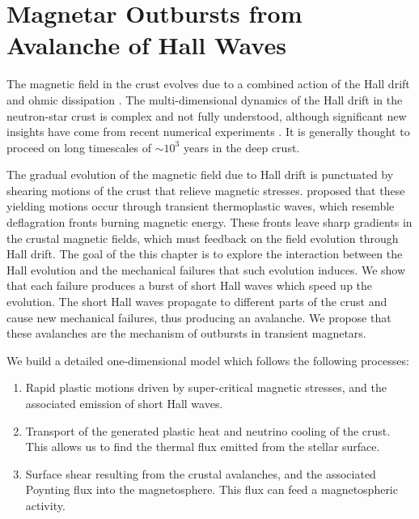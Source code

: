 \def\T{{\mathcal T}}
\def\scr{s_{\rm cr}}
\def\Ts{T_{\rm s}}
\def\Tm{T_{\rm melt}}
\def\zmelt{z_{\rm melt}}
\def\beq{\begin{equation}}
\def\eeq{\end{equation}}
\def\sel{s_{\rm el}}
\def\spl{s_{\rm pl}}
\def\dspl{\dot{s}_{\rm pl}}
\def\sigcr{\sigma_{\rm cr}}
\def\Um{U_{\rm melt}}
\def\Uth{U_{\rm th}}
\def\Eq{Equation}
\def\Eqs{Equations}
\def\Ekin{E_{\rm kin}}
\def\Emag{E_{\rm mag}}
\def\Eel{E_{\rm el}}
\def\zd{z_{\rm damp}}
\def\Eaft{E_{\rm aft}}
\def\tc{t_{\rm cond}}
\def\LL{L}
\def\lw{l}
\def\Lum{\mathscr L}
\def\sigcr{\sigma_{\rm cr}}
\def\Bcr{B_{\rm cr}}

\chapter[Magnetar Outbursts from Avalanche of Hall Waves]{Magnetar Outbursts from Avalanche of Hall Waves}
\label{chap:hall}
The magnetic field in the crust evolves due to a combined action of the Hall drift and ohmic dissipation \citep{1992ApJ...395..250G, 2004MNRAS.347.1273H,2013MNRAS.434..123V}. 
The multi-dimensional dynamics of the Hall drift in the neutron-star crust is complex and not fully understood, although significant new insights have come from recent numerical experiments \citep{2012MNRAS.421.2722K, 2013MNRAS.434.2480G,2014MNRAS.438.1618G,2015MNRAS.446.1121G, 2015PhRvL.114s1101W}. It is generally thought to proceed on long timescales of $\sim 10^3$ years in the deep crust.

The gradual evolution of the magnetic field due to Hall drift is punctuated by shearing motions of the crust that relieve magnetic stresses. 
\citet{2014ApJ...794L..24B} proposed that these yielding motions occur through transient thermoplastic waves, which resemble deflagration fronts burning magnetic energy. 
These fronts leave sharp gradients in the crustal magnetic fields, which must feedback on the field evolution through Hall drift.
The goal of the this chapter is to explore the interaction between the Hall evolution and the mechanical failures that such evolution induces. 
We show that each failure produces a burst of short Hall waves which speed up the evolution. 
The short Hall waves propagate to different parts of the crust and cause new mechanical failures, thus producing an avalanche. 
We propose that these avalanches are the mechanism of outbursts in transient magnetars.
 
We build a detailed one-dimensional model which follows the following processes:
\begin{enumerate}
	\item Rapid plastic motions driven by super-critical magnetic stresses,
and the associated emission of short Hall waves.
	\item Transport of the generated plastic heat and neutrino cooling of the crust. This allows us to find the thermal flux emitted from the stellar surface.
	\item Surface shear resulting from the crustal avalanches, and the associated Poynting flux into the magnetosphere. This flux can feed a magnetospheric activity.

\end{enumerate} 

